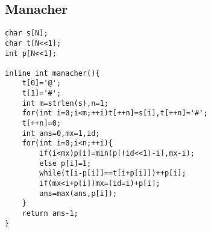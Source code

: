 \documentclass{ctexart}
\begin{document}
\subsection{Manacher}
\begin{lstlisting}
char s[N];
char t[N<<1];
int p[N<<1];

inline int manacher(){
    t[0]='@';
    t[1]='#';
    int m=strlen(s),n=1;
    for(int i=0;i<m;++i)t[++n]=s[i],t[++n]='#';
    t[++n]=0;
    int ans=0,mx=1,id;
    for(int i=0;i<n;++i){
        if(i<mx)p[i]=min(p[(id<<1)-i],mx-i);
        else p[i]=1;
        while(t[i-p[i]]==t[i+p[i]])++p[i];
        if(mx<i+p[i])mx=(id=i)+p[i];
        ans=max(ans,p[i]);
    }
    return ans-1;
}

\end{lstlisting}
\end{document}
